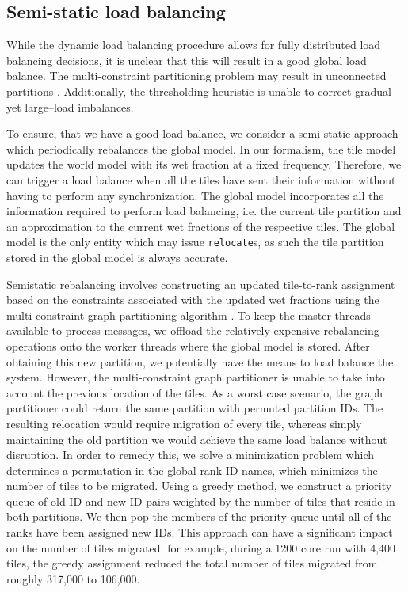\subsection{Semi-static load balancing}
While the dynamic load balancing procedure allows for fully distributed load balancing decisions, it is unclear that this will result in a good global load balance. The multi-constraint partitioning problem may result in unconnected partitions \cite{KKMC}.  Additionally, the thresholding heuristic is unable to correct gradual--yet large--load imbalances.

To ensure, that we have a good load balance, we consider a semi-static approach which periodically rebalances the global model.  In our formalism, the tile model updates the world model with its wet fraction at a fixed frequency.  Therefore, we can trigger a load balance when all the tiles have sent their information without having to perform any synchronization. %
The global model incorporates all the information required to perform load balancing, i.e. the current tile partition and an approximation to the current wet fractions of the respective tiles. The global model is the only entity which may issue {\tt relocate}s, as such the tile partition stored in the global model is always accurate.

Semistatic rebalancing involves constructing an updated tile-to-rank assignment based on the constraints associated with the updated wet fractions using the multi-constraint graph partitioning algorithm \cite{KKMC}. To keep the master threads available to process messages, we offload the relatively expensive rebalancing operations onto the worker threads where the global model is stored. After obtaining this new partition, we potentially have the means to load balance the system. However, the multi-constraint graph partitioner is unable to take into account the previous location of the tiles. As a worst case scenario, the graph partitioner could return the same partition with permuted partition IDs. The resulting relocation would require migration of every tile, whereas simply maintaining the old partition we would achieve the same load balance without disruption.
In order to remedy this, we solve a minimization problem which determines a permutation in the global rank ID names, which minimizes the number of tiles to be migrated. Using a greedy method, we construct a priority queue of old ID and new ID pairs weighted by the number of tiles that reside in both partitions. We then pop the members of the priority queue until all of the ranks have been assigned new IDs.
This approach can have a significant impact on the number of tiles migrated: for example, during a 1200 core run with 4,400 tiles, the greedy assignment reduced the total number of tiles migrated from roughly 317,000 to 106,000.